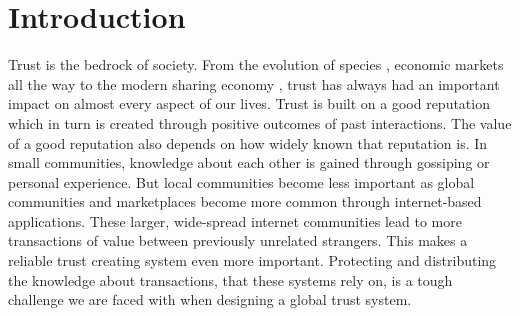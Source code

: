\chapter{Introduction}
\label{chap:introduction}



Trust is the bedrock of society. From the evolution of species \cite{MOHTASHEMI2003523, nowak2006five, Axelrod1390}, economic markets \cite{akerlof1970lemons} all the way to the 
modern sharing economy \cite{resnick2002trust}, trust has always had an important impact on almost every aspect of our lives.
Trust is built on a good reputation which in turn is created through positive outcomes of past 
interactions. The value of a good reputation also depends on how widely known that reputation is.
In small communities, knowledge about each other is gained through gossiping or personal experience. 
But local communities become less important as global communities and marketplaces become more common
through internet-based applications. These larger, wide-spread internet communities lead to more
transactions of value between previously unrelated strangers. This makes a reliable trust creating
system even more important. Protecting and distributing the knowledge about transactions, that these 
systems rely on, is a tough challenge we are faced with when designing a global trust system.

